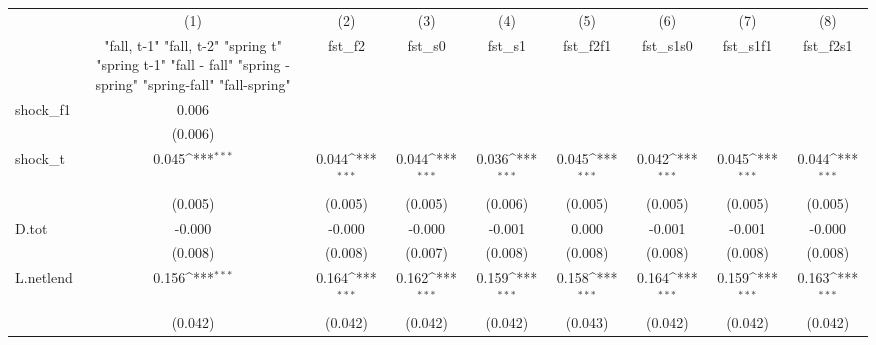 {
\def\sym#1{\ifmmode^{#1}\else\(^{#1}\)\fi}
\begin{tabular}{l*{8}{c}}
\toprule
            &\multicolumn{1}{c}{(1)}&\multicolumn{1}{c}{(2)}&\multicolumn{1}{c}{(3)}&\multicolumn{1}{c}{(4)}&\multicolumn{1}{c}{(5)}&\multicolumn{1}{c}{(6)}&\multicolumn{1}{c}{(7)}&\multicolumn{1}{c}{(8)}\\
            &\multicolumn{1}{c}{  "fall, t-1" "fall, t-2" "spring t" "spring t-1"  "fall - fall" "spring - spring" "spring-fall" "fall-spring" }&\multicolumn{1}{c}{fst\_f2}&\multicolumn{1}{c}{fst\_s0}&\multicolumn{1}{c}{fst\_s1}&\multicolumn{1}{c}{fst\_f2f1}&\multicolumn{1}{c}{fst\_s1s0}&\multicolumn{1}{c}{fst\_s1f1}&\multicolumn{1}{c}{fst\_f2s1}\\
\midrule
shock\_f1    &       0.006         &                     &                     &                     &                     &                     &                     &                     \\
            &     (0.006)         &                     &                     &                     &                     &                     &                     &                     \\
\addlinespace
shock\_t     &       0.045\sym{***}&       0.044\sym{***}&       0.044\sym{***}&       0.036\sym{***}&       0.045\sym{***}&       0.042\sym{***}&       0.045\sym{***}&       0.044\sym{***}\\
            &     (0.005)         &     (0.005)         &     (0.005)         &     (0.006)         &     (0.005)         &     (0.005)         &     (0.005)         &     (0.005)         \\
\addlinespace
D.tot       &      -0.000         &      -0.000         &      -0.000         &      -0.001         &       0.000         &      -0.001         &      -0.001         &      -0.000         \\
            &     (0.008)         &     (0.008)         &     (0.007)         &     (0.008)         &     (0.008)         &     (0.008)         &     (0.008)         &     (0.008)         \\
\addlinespace
L.netlend   &       0.156\sym{***}&       0.164\sym{***}&       0.162\sym{***}&       0.159\sym{***}&       0.158\sym{***}&       0.164\sym{***}&       0.159\sym{***}&       0.163\sym{***}\\
            &     (0.042)         &     (0.042)         &     (0.042)         &     (0.042)         &     (0.043)         &     (0.042)         &     (0.042)         &     (0.042)         \\

\end{tabular}}

